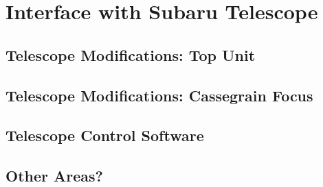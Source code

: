 \def\thisdir{development/telescope/}

\chapter{Interface with Subaru Telescope
\label{chap:tel}}

\section{Telescope Modifications: Top Unit}

\section{Telescope Modifications: Cassegrain Focus}

\section{Telescope Control Software}

\section{Other Areas?}


